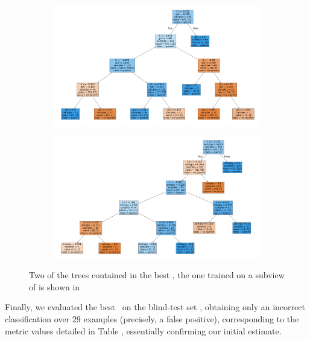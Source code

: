 \begin{figure}[!ht]
	\centering
	\begin{subfigure}{\linewidth}
		\includegraphics[width=\linewidth]{img/Bn_3_6_8_15_pt_dt.png}
	\end{subfigure}
	\begin{subfigure}{\linewidth}
		\includegraphics[width=\linewidth]{img/Cnmod_3_4_5_14_pt_dt.png}
	\end{subfigure}
	\caption{Two of the trees contained in the best \ta, the one trained on a subview of \an is
		shown in } \label{fig:part-of-bta}
\end{figure}

Finally, we evaluated the best \ta\ on the blind-test set \db, obtaining only an incorrect
classification over $29$ examples (precisely, a false positive), corresponding to the metric values
detailed in Table , essentially confirming our initial estimate.

